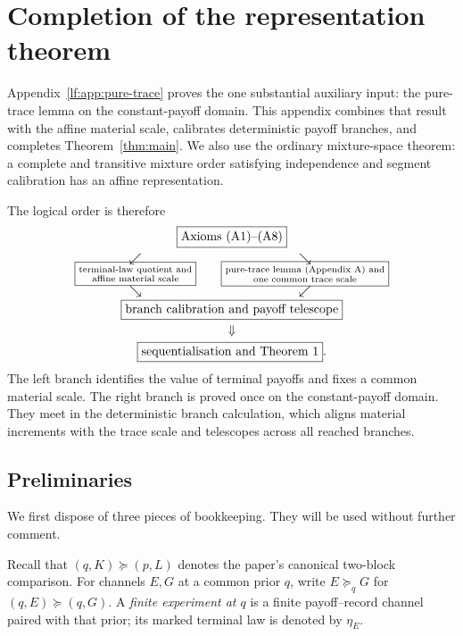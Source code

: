 \section{Completion of the representation theorem}\label{app:main-proof}

Appendix~\ref{lf:app:pure-trace} proves the one substantial auxiliary input: the pure-trace lemma on the constant-payoff domain.  This appendix combines that result with the affine material scale, calibrates deterministic payoff branches, and completes Theorem~\ref{thm:main}.  We also use the ordinary mixture-space theorem: a complete and transitive mixture order satisfying independence and segment calibration has an affine representation.

The logical order is therefore
\[
\begin{gathered}
\boxed{\text{Axioms \textup{(A1)--(A8)}}}\\[-0.1em]
\begin{array}{ccc}
\swarrow && \searrow\\[-0.4em]
\boxed{\substack{\text{terminal-law quotient and}\\
                  \text{affine material scale}}}
&&
\boxed{\substack{\text{pure-trace lemma (Appendix A) and}\\
                  \text{one common trace scale}}}\\[-0.2em]
\searrow && \swarrow
\end{array}\\[-0.3em]
\boxed{\text{branch calibration and payoff telescope}}\\[-0.1em]
\Downarrow\\[-0.1em]
\boxed{\text{sequentialisation and Theorem 1}}.
\end{gathered}
\]
The left branch identifies the value of terminal payoffs and fixes a common
material scale.  The right branch is proved once on the constant-payoff
domain.  They meet in the deterministic branch calculation, which aligns
material increments with the trace scale and telescopes across all reached
branches.

\subsection{Preliminaries}

We first dispose of three pieces of bookkeeping.  They will be used without
further comment.

Recall that $(q,K)\succeq(p,L)$ denotes the paper's canonical two-block
comparison.  For channels $E,G$ at a common prior $q$, write
$E\succeq_q G$ for $(q,E)\succeq(q,G)$.  A \emph{finite experiment at $q$}
is a finite payoff--record channel paired with that prior; its marked terminal
law is denoted by $\eta_E$.

